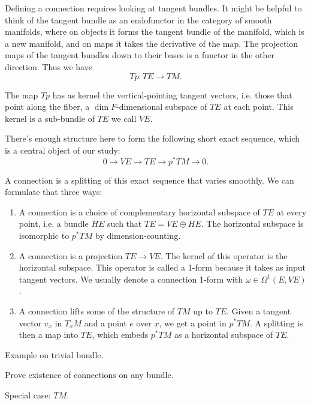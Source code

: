 \documentclass[12pt]{article}
\newcommand{\gc}[1]{\marginpar{\bf $\leftarrow$ {#1}}}
\newcommand{\comment}[1]{}
\begin{document}
Defining a connection requires looking at tangent bundles. It might be helpful to think of the tangent bundle as an endofunctor in the category of smooth manifolds, where on objects it forms the tangent bundle of the manifold, which is a new manifold, and on maps it takes the derivative of the map. The projection maps of the tangent bundles down to their bases is a functor in the other direction. Thus we have $$Tp:TE\to TM.$$ \gc{expand a bit}

The map $Tp$ has as kernel the vertical-pointing tangent vectors, i.e. those that point along the fiber, a $\dim F$-dimensional subspace of $TE$ at each point. This kernel is a sub-bundle of $TE$ we call $VE$.

There's enough structure here to form the following short exact sequence, which is a central object of our study: $$0\to VE\to TE \to p^* TM\to 0.$$
\comment{https://mathoverflow.net/questions/245525/geometric-interpretation-of-horizontal-and-vertical-lift-of-vector-field/245576#245576}
\comment{Atiyah Sequences: Biswas paper and https://mathoverflow.net/questions/330797/atiyah-sequence-and-connections-on-a-principal-bundle}

A connection is a splitting of this exact sequence that varies smoothly. We can formulate that three ways:

\begin{enumerate}
\item A connection is a choice of complementary horizontal subspace of $TE$ at every point, i.e. a bundle $HE$ such that $TE=VE\oplus HE$. The horizontal subspace is isomorphic to $p^* TM$ by dimension-counting.

\item A connection is a projection $TE\to VE$. The kernel of this operator is the horizontal subspace. This operator is called a 1-form because it takes as input tangent vectors. We usually denote a connection 1-form with $\omega\in\Omega^1(E, VE)$.

\item A connection lifts some of the structure of $TM$ up to $TE$. Given a tangent vector $v_x$ in $T_x M$ and a point $e$ over $x$, we get a point in $p^* TM$. A splitting is then a map into $TE$, which embeds $p^* TM$ as a horizontal subspace of $TE$.
\end{enumerate}

Example on trivial bundle.

Prove existence of connections on any bundle.

Special case: $TM$.
\end{document}
